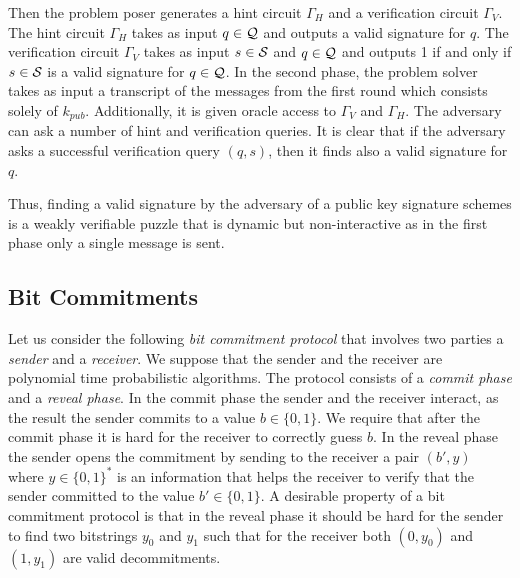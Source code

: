 Then the problem poser generates a hint circuit $\Gamma_H$ and a verification circuit $\Gamma_V$.
The hint circuit $\Gamma_H$ takes as input $q \in \mathcal{Q}$ and outputs a valid signature for $q$. The verification circuit
$\Gamma_V$ takes as input $s \in \mathcal{S}$ and $q \in \mathcal{Q}$ and outputs 1 if and only if $s \in \mathcal{S}$ is a valid signature for $q \in \mathcal{Q}$.
In the second phase, the problem solver takes as input a transcript of the messages from the first round which consists solely of $k_{pub}$.
Additionally, it is given oracle access to $\Gamma_V$ and $\Gamma_H$.
The adversary can ask a number of hint and verification queries.
It is clear that if the adversary asks a successful verification query $(q,s)$, then it finds also a valid signature for $q$.

Thus, finding a valid signature by the adversary of a public key signature schemes is a weakly verifiable puzzle that
is dynamic but non-interactive as in the first phase only a single message is sent.
%
\subsection{Bit Commitments}
Let us consider the following \textit{bit commitment protocol} that involves two parties a \textit{sender} and a \textit{receiver}.
We suppose that the sender and the receiver are polynomial time probabilistic algorithms.
The protocol consists of a \textit{commit phase} and a \textit{reveal phase}.
In the commit phase the sender and the receiver interact, as the result the sender commits to a value $b \in \{0,1\}$.
We require that after the commit phase it is hard for the receiver to correctly guess $b$.
In the reveal phase the sender opens the commitment by sending to the receiver a pair $(b', y)$ where $y \in \{0,1\}^{*}$ is an information
that helps the receiver to verify that the sender committed to the value $b' \in \{0,1\}$.
A desirable property of a bit commitment protocol is that in the reveal phase it
should be hard for the sender to find two bitstrings $y_0$ and $y_1$ such that
for the receiver both $(0,y_0)$ and $(1, y_1)$ are valid decommitments.

